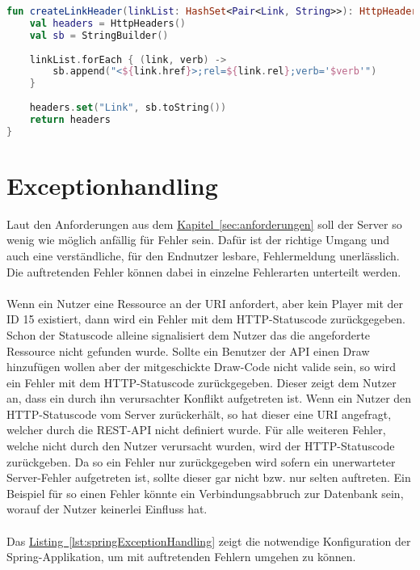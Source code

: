\begin{lstlisting}[style=lstStyleFramed, language=Kotlin, caption={Linkaufbau mithilfe des Projektes \enquote{Spring HATEOAS}}, label=lst:createLinkHeader, float]
fun createLinkHeader(linkList: HashSet<Pair<Link, String>>): HttpHeaders {
	val headers = HttpHeaders()
	val sb = StringBuilder()
	
	linkList.forEach { (link, verb) ->
		sb.append("<${link.href}>;rel=${link.rel};verb='$verb'")
	}
	
	headers.set("Link", sb.toString())
	return headers
}
\end{lstlisting}

\section{Exceptionhandling}
Laut den Anforderungen aus dem \hyperref[sec:anforderungen]{Kapitel~\ref{sec:anforderungen}} soll der Server so wenig wie möglich anfällig für Fehler sein. Dafür ist der richtige Umgang und auch eine verständliche, für den Endnutzer lesbare, Fehlermeldung unerlässlich. Die auftretenden Fehler können dabei in einzelne Fehlerarten unterteilt werden.\\
\\
Wenn ein Nutzer eine Ressource an der \gls{URI}  anfordert, aber kein Player mit der ID 15 existiert, dann wird ein Fehler mit dem \gls{HTTP}-Statuscode  zurückgegeben. Schon der Statuscode alleine signalisiert dem Nutzer das die angeforderte Ressource nicht gefunden wurde. Sollte ein Benutzer der \gls{API} einen Draw hinzufügen wollen aber der mitgeschickte Draw-Code nicht valide sein, so wird ein Fehler mit dem \gls{HTTP}-Statuscode  zurückgegeben. Dieser zeigt dem Nutzer an, dass ein durch ihn verursachter Konflikt aufgetreten ist. Wenn ein Nutzer den \gls{HTTP}-Statuscode  vom Server zurückerhält, so hat dieser eine \gls{URI} angefragt, welcher durch die \gls{REST}-\gls{API} nicht definiert wurde. Für alle weiteren Fehler, welche nicht durch den Nutzer verursacht wurden, wird der \gls{HTTP}-Statuscode  zurückgeben. Da so ein Fehler nur zurückgegeben wird sofern ein unerwarteter Server-Fehler aufgetreten ist, sollte dieser gar nicht bzw. nur selten auftreten. Ein Beispiel für so einen Fehler könnte ein Verbindungsabbruch zur Datenbank sein, worauf der Nutzer keinerlei Einfluss hat.\\
\\
Das \hyperref[lst:springExceptionHandling]{Listing~\ref{lst:springExceptionHandling}} zeigt die notwendige Konfiguration der Spring-Applikation, um mit auftretenden Fehlern umgehen zu können.\\
